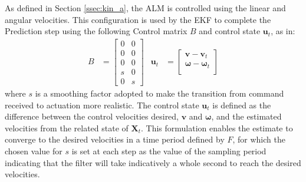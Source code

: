As defined in Section \ref{ssec:kin_a}, the \gls{ALM} is controlled using the linear and angular velocities.
This configuration is used by the \gls{EKF} to complete the Prediction step using the following Control matrix $B$ and control state $\mathbf{u}_t$, as in:%
\begin{align}
	\label{eq:cmd}
	B &=
	\begin{bmatrix}
		0 & 0 \\
		0 & 0\\
		0 & 0\\
		s & 0\\
		0 & s
	\end{bmatrix}
	&
	\mathbf{u}_t &=
	\begin{bmatrix}
		\mathbf{v} - \mathbf{v}_t  \\
		\boldsymbol \omega - \boldsymbol \omega_t \\[0.3em]
	\end{bmatrix}
\end{align}
where $s$ is a smoothing factor adopted to make the transition from command received to actuation more realistic. %
The control state $\mathbf{u}_t$ is defined as the difference between the control velocities desired, $\mathbf{v}$ and  $\boldsymbol \omega$, and the estimated velocities from the related state of $\mathbf{X}_t$.
This formulation enables the estimate to converge to the desired velocities in a time period defined by $F$, for which the chosen value for $s$ is set at each step as the value of the sampling period indicating that the filter will take indicatively a whole second to reach the desired velocities. %

